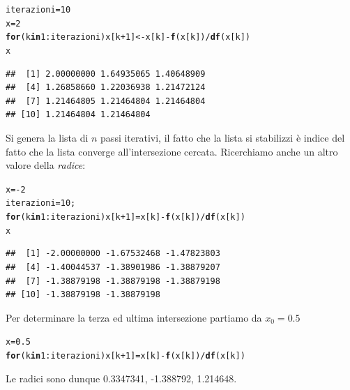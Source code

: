 \documentclass[onecolumn,11pt]{book}\usepackage[]{graphicx}\usepackage[]{color}
\makeatletter
\newcommand{\hlnum}[1]{\textcolor[rgb]{0.686,0.059,0.569}{#1}}%
\newcommand{\hlopt}[1]{\textcolor[rgb]{0,0,0}{#1}}%
\newcommand{\hlstd}[1]{\textcolor[rgb]{0.345,0.345,0.345}{#1}}%
\newcommand{\hlkwa}[1]{\textcolor[rgb]{0.161,0.373,0.58}{\textbf{#1}}}%
\newcommand{\hlkwb}[1]{\textcolor[rgb]{0.69,0.353,0.396}{#1}}%
\newcommand{\hlkwd}[1]{\textcolor[rgb]{0.737,0.353,0.396}{\textbf{#1}}}%
\newenvironment{kframe}{%
 \def\at@end@of@kframe{}%
 \ifinner\ifhmode%
  \def\at@end@of@kframe{\end{minipage}}%
  \begin{minipage}{\columnwidth}%
 \fi\fi%
 \def\FrameCommand##1{\hskip\@totalleftmargin \hskip-\fboxsep
 \colorbox{shadecolor}{##1}\hskip-\fboxsep
     \hskip-\linewidth \hskip-\@totalleftmargin \hskip\columnwidth}%
 \MakeFramed {\advance\hsize-\width
   \@totalleftmargin\z@ \linewidth\hsize
   \@setminipage}}%
 {\par\unskip\endMakeFramed%
 \at@end@of@kframe}
\newenvironment{knitrout}{}{} %
\makeatother
\begin{document}
\begin{knitrout}
\color{fgcolor}\begin{kframe}
\begin{alltt}
\hlstd{iterazioni}\hlkwb{=}\hlnum{10}
\hlstd{x}\hlkwb{=}\hlnum{2}
\hlkwa{for}\hlstd{(k} \hlkwa{in} \hlnum{1}\hlopt{:}\hlstd{iterazioni) x[k}\hlopt{+}\hlnum{1}\hlstd{]}\hlkwb{<-}\hlstd{x[k]}\hlopt{-}\hlkwd{f}\hlstd{(x[k])}\hlopt{/}\hlkwd{df}\hlstd{(x[k])}
\hlstd{x}
\end{alltt}
\begin{verbatim}
##  [1] 2.00000000 1.64935065 1.40648909
##  [4] 1.26858660 1.22036938 1.21472124
##  [7] 1.21464805 1.21464804 1.21464804
## [10] 1.21464804 1.21464804
\end{verbatim}
\end{kframe}
\end{knitrout}
Si genera la lista di $n$ passi iterativi, il fatto che la lista si stabilizzi \`e indice del fatto che la lista converge all'intersezione cercata.  Ricerchiamo anche un altro valore della {\it radice}:
\begin{knitrout}
\color{fgcolor}\begin{kframe}
\begin{alltt}
\hlstd{x}\hlkwb{=} \hlopt{-}\hlnum{2}
\hlstd{iterazioni}\hlkwb{=}\hlnum{10}\hlstd{;}
\hlkwa{for}\hlstd{(k} \hlkwa{in} \hlnum{1}\hlopt{:}\hlstd{iterazioni) x[k}\hlopt{+}\hlnum{1}\hlstd{]} \hlkwb{=} \hlstd{x[k]}\hlopt{-}\hlkwd{f}\hlstd{(x[k])}\hlopt{/}\hlkwd{df}\hlstd{(x[k])}
\hlstd{x}
\end{alltt}
\begin{verbatim}
##  [1] -2.00000000 -1.67532468 -1.47823803
##  [4] -1.40044537 -1.38901986 -1.38879207
##  [7] -1.38879198 -1.38879198 -1.38879198
## [10] -1.38879198 -1.38879198
\end{verbatim}
\end{kframe}
\end{knitrout}
Per determinare la terza ed ultima intersezione partiamo da $x_0=0.5$
\begin{knitrout}
\color{fgcolor}\begin{kframe}
\begin{alltt}
\hlstd{x}\hlkwb{=}\hlnum{0.5}
\hlkwa{for}\hlstd{(k} \hlkwa{in} \hlnum{1}\hlopt{:}\hlstd{iterazioni) x[k}\hlopt{+}\hlnum{1}\hlstd{]}\hlkwb{=}\hlstd{x[k]}\hlopt{-}\hlkwd{f}\hlstd{(x[k])}\hlopt{/}\hlkwd{df}\hlstd{(x[k])}
\end{alltt}
\end{kframe}
\end{knitrout}
Le radici sono dunque 0.3347341, -1.388792, 1.214648.
\end{document}
